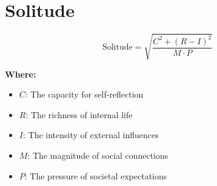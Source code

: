 \chapter{Solitude}

\begin{equation}
\text{Solitude} = \sqrt{\frac{C^2 + (R - I)^2}{M \cdot P}} 
\end{equation}

\textbf{Where:}

\begin{itemize}
    \item $C$: The capacity for self-reflection
    \item $R$: The richness of internal life
    \item $I$: The intensity of external influences
    \item $M$: The magnitude of social connections
    \item $P$: The pressure of societal expectations
\end{itemize}